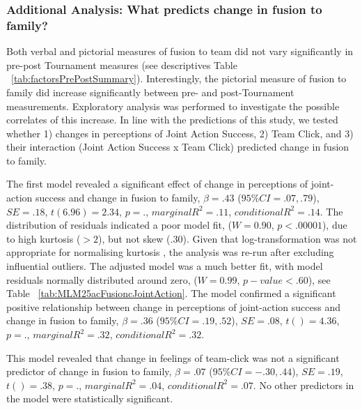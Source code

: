 {\subsubsection{Additional Analysis: What predicts change in fusion to family?}
Both verbal and pictorial measures of fusion to team did not vary significantly in pre-post Tournament measures (see descriptives Table ~\ref{tab:factorsPrePostSummary}).  Interestingly, the pictorial measure of fusion to family did increase significantly between pre- and post-Tournament measurements.  Exploratory analysis was performed to investigate the possible correlates of this increase. In line with the predictions of this study, we tested whether 1) changes in perceptions of Joint Action Success, 2) Team Click, and 3) their interaction (Joint Action Success x Team Click) predicted change in fusion to family.

The first model revealed a significant effect of change in perceptions of joint-action success and change in fusion to family, $\beta = .43$ ($95\% CI =  .07, .79$), $SE = .18$, $t(6.96) = 2.34$, $p = .$, $marginal R^2 = .11$, $conditional R^2 = .14$.  The distribution of residuals indicated a poor model fit, ($W = 0.90$, $p < .00001$), due to high kurtosis ($> 2$), but not skew (.30). Given that log-transformation was not appropriate for normalising kurtosis \citep{Glass1972}, the analysis was re-run after excluding influential outliers.  The adjusted model was a much better fit, with model residuals normally distributed around zero, ($W = 0.99$, $p-value < .60$), see Table ~\ref{tab:MLM25acFusioncJointAction}. The model confirmed a significant positive relationship between change in perceptions of joint-action success and change in fusion to family, $\beta = .36$ ($95\% CI =  .19, .52$), $SE = .08$, $t() = 4.36$, $p = .$, $marginal R^2 = .32$, $conditional R^2 = .32$.




This model revealed that change in feelings of team-click was not a significant predictor of change in fusion to family, $\beta = .07$ ($95\% CI =  -.30, .44$), $SE = .19$, $t() = .38$, $p = .$, $marginal R^2 = .04$, $conditional R^2 = .07$. No other predictors in the model were statistically significant.

}
